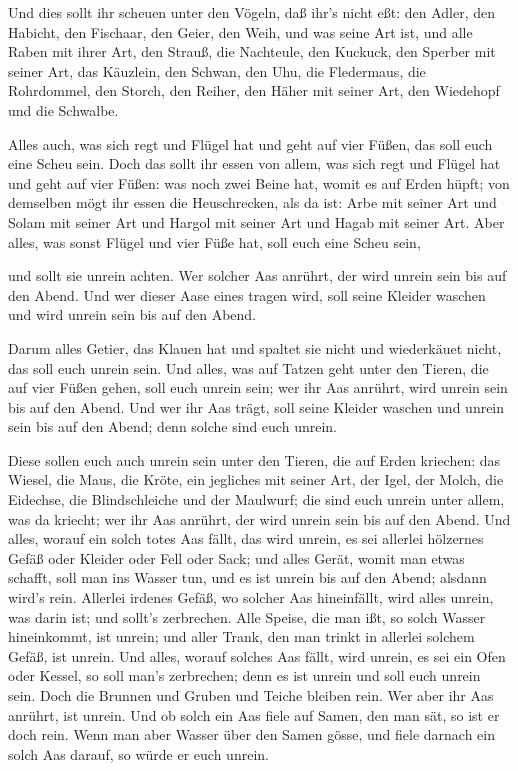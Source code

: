  Und dies sollt ihr scheuen unter den Vögeln, daß ihr's
nicht eßt: den Adler, den Habicht, den Fischaar,  den
Geier, den Weih, und was seine Art ist,  und alle Raben mit
ihrer Art,  den Strauß, die Nachteule, den Kuckuck, den
Sperber mit seiner Art,  das Käuzlein, den Schwan, den Uhu,
 die Fledermaus, die Rohrdommel,  den Storch,
den Reiher, den Häher mit seiner Art, den Wiedehopf und die Schwalbe.

 Alles auch, was sich regt und Flügel hat und geht auf vier
Füßen, das soll euch eine Scheu sein.  Doch das sollt ihr
essen von allem, was sich regt und Flügel hat und geht auf vier Füßen:
was noch zwei Beine hat, womit es auf Erden hüpft;  von
demselben mögt ihr essen die Heuschrecken, als da ist: Arbe mit seiner
Art und Solam mit seiner Art und Hargol mit seiner Art und Hagab mit
seiner Art.  Aber alles, was sonst Flügel und vier Füße
hat, soll euch eine Scheu sein,

 und sollt sie unrein achten. Wer solcher Aas anrührt, der
wird unrein sein bis auf den Abend.  Und wer dieser Aase
eines tragen wird, soll seine Kleider waschen und wird unrein sein bis
auf den Abend.

 Darum alles Getier, das Klauen hat und spaltet sie nicht
und wiederkäuet nicht, das soll euch unrein sein.  Und
alles, was auf Tatzen geht unter den Tieren, die auf vier Füßen gehen,
soll euch unrein sein; wer ihr Aas anrührt, wird unrein sein bis auf den
Abend.  Und wer ihr Aas trägt, soll seine Kleider waschen
und unrein sein bis auf den Abend; denn solche sind euch unrein.

 Diese sollen euch auch unrein sein unter den Tieren, die
auf Erden kriechen: das Wiesel, die Maus, die Kröte, ein jegliches mit
seiner Art,  der Igel, der Molch, die Eidechse, die
Blindschleiche und der Maulwurf;  die sind euch unrein
unter allem, was da kriecht; wer ihr Aas anrührt, der wird unrein sein
bis auf den Abend.  Und alles, worauf ein solch totes Aas
fällt, das wird unrein, es sei allerlei hölzernes Gefäß oder Kleider
oder Fell oder Sack; und alles Gerät, womit man etwas schafft, soll man
ins Wasser tun, und es ist unrein bis auf den Abend; alsdann wird's
rein.  Allerlei irdenes Gefäß, wo solcher Aas hineinfällt,
wird alles unrein, was darin ist; und sollt's zerbrechen. 
Alle Speise, die man ißt, so solch Wasser hineinkommt, ist unrein; und
aller Trank, den man trinkt in allerlei solchem Gefäß, ist unrein.
 Und alles, worauf solches Aas fällt, wird unrein, es sei
ein Ofen oder Kessel, so soll man's zerbrechen; denn es ist unrein und
soll euch unrein sein.  Doch die Brunnen und Gruben und
Teiche bleiben rein. Wer aber ihr Aas anrührt, ist unrein. 
Und ob solch ein Aas fiele auf Samen, den man sät, so ist er doch rein.
 Wenn man aber Wasser über den Samen gösse, und fiele
darnach ein solch Aas darauf, so würde er euch unrein.


